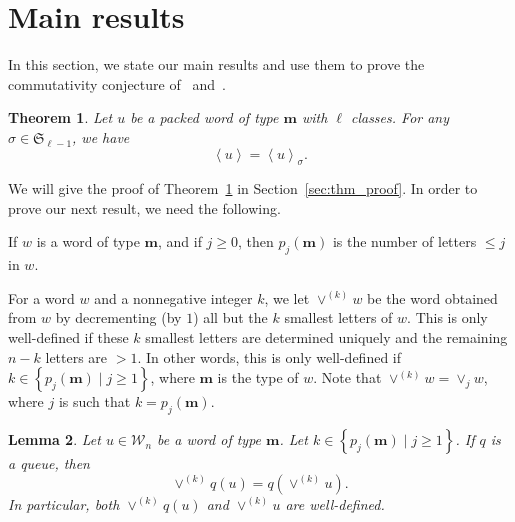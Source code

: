 \documentclass[reqno]{amsart}%
\newcommand{\0}{\phantom{c}}
\newcommand{\mm}{\mathbf{m}}
\theoremstyle{plain}
\newtheorem{thm}{Theorem}[section]
\newtheorem{lemma}[thm]{Lemma}
\theoremstyle{definition}
\numberwithin{equation}{section}
\newcommand{\Travis}[1]{\todo[size=\tiny,inline,color=blue!30]{#1
      \\ \hfill --- Travis}}
\begin{document}


\section{Main results}

\label{sec:result}

In this section, we state our main results and use them to prove the
commutativity conjecture of~\cite{AAMP} and~\cite[Conj.~3.10]{AasLin17}.

\begin{thm}
\label{thm:permutation} Let $u$ be a packed word of type $\mathbf{m}$ with
$\ell$ classes. For any $\sigma\in\mathfrak{S}_{\ell-1}$, we have
\[
\left\langle u \right\rangle = \left\langle u \right\rangle _{\sigma}.
\]

\end{thm}

We will give the proof of Theorem~\ref{thm:permutation} in
Section~\ref{sec:thm_proof}. In order to prove our next result, we need the following.

If $w$ is a word of type $\mathbf{m}$, and if $j \geq0$, then $p_{j}%
(\mathbf{m})$ is the number of letters $\leq j$ in $w$.

For a word $w$ and a nonnegative integer $k$, we let
{\color{darkred}\emph{$\vee^{(k)} w$}} be the word obtained from $w$ by
decrementing (by $1$) all but the $k$ smallest letters of $w$. This is only
well-defined if these $k$ smallest letters are determined uniquely and the
remaining $n-k$ letters are $> 1$. In other words, this is only well-defined
if $k \in\left\{  p_{j}(\mathbf{m}) \mid j \geq1 \right\}  $, where
$\mathbf{m}$ is the type of $w$. Note that $\vee^{(k)} w = \vee_{j} w$, where
$j$ is such that $k = p_{j}(\mathbf{m})$.




\begin{lemma}
\label{lemma:queue_merge_commute} Let $u \in\mathcal{W}_{n}$ be a word of type
$\mathbf{m}$. Let $k \in\left\{  p_{j}(\mathbf{m}) \mid j \geq1 \right\}  $.
If $q$ is a queue, then
\[
\vee^{(k)} q(u) = q(\vee^{(k)} u).
\]
In particular, both $\vee^{(k)} q(u)$ and $\vee^{(k)} u$ are well-defined.
\end{lemma}
\end{document}
